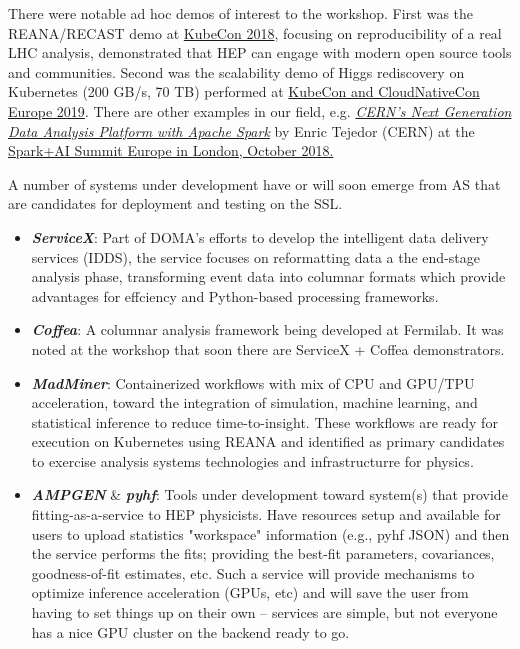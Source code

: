 \documentclass[11pt,letterpaper,fleqn]{article}
\begin{document}
There were notable ad hoc demos of interest to the workshop. First was the {\sf REANA}/{\sf RECAST} demo at \href{https://kccna18.sched.com}{KubeCon 2018}, focusing on reproducibility of a real LHC analysis, demonstrated that HEP can engage with modern open source tools and communities. Second was the scalability demo of Higgs rediscovery on Kubernetes (200 GB/s, 70 TB) performed at \href{https://events.linuxfoundation.org/events/kubecon-cloudnativecon-europe-2019/}{KubeCon and CloudNativeCon Europe 2019}. There are other examples in our field, e.g. \href{https://www.youtube.com/watch?v=Ye8MlJQumaI}{\textit {CERN’s Next Generation Data Analysis Platform with Apache Spark}} by Enric Tejedor (CERN) at the \href{https://databricks.com/sparkaisummit/europe?utm_source=google&utm_medium=cpc&utm_campaign=g_s_brand_beta&gclid=EAIaIQobChMIhO7fksjC5AIVDRgMCh0kFwcaEAAYASAAEgKjSPD_BwE}{Spark+AI Summit Europe in London, October 2018.}

A number of systems under development have or will soon emerge from AS that are candidates for deployment and testing on the SSL.
\begin{itemize}
  \item \textbf{\textit{ServiceX}}: Part of DOMA's efforts to develop the intelligent data delivery services (IDDS), the service focuses on reformatting data a the end-stage analysis phase, transforming event data into columnar formats which provide advantages for effciency and Python-based processing frameworks.
  \item \textbf{\textit{Coffea}}: A columnar analysis framework being developed at Fermilab. It was noted at the workshop that soon there are ServiceX + Coffea demonstrators.
  \item \textbf{\textit{MadMiner}}: Containerized workflows with mix of CPU and GPU/TPU acceleration, toward the integration of simulation, machine learning, and statistical inference to reduce time-to-insight. These workflows are ready for execution on Kubernetes using {\sf REANA} and identified as primary candidates to exercise analysis systems technologies and infrastructurre for physics.
  \item \textbf{\textit{AMPGEN}} \& \textbf{\textit{pyhf}}: Tools under development toward system(s) that provide fitting-as-a-service to HEP physicists. Have resources setup and available for users to upload statistics "workspace" information (e.g., pyhf JSON) and then the service performs the fits; providing the best-fit parameters, covariances, goodness-of-fit estimates, etc. Such a service will provide mechanisms to optimize inference acceleration (GPUs, etc) and will save the user from having to set things up on their own -- services are simple, but not everyone has a nice GPU cluster on the backend ready to go.
\end{itemize}
\end{document}
